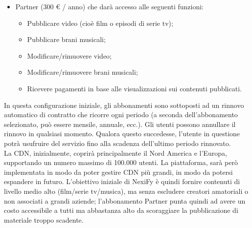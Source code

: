 \begin{itemize}
	\item Partner (300 € / anno) che darà accesso alle seguenti funzioni:
	\begin{itemize}
   		\item Pubblicare video (cioè film o episodi di serie tv);
		\item Pubblicare brani musicali;
		\item Modificare/rimuovere video;
		\item Modificare/rimuovere brani musicali;
		\item Ricevere pagamenti in base alle visualizzazioni sui contenuti pubblicati.
	\end{itemize}
\end{itemize}

In questa configurazione iniziale, gli abbonamenti sono sottoposti ad un rinnovo automatico di contratto che
ricorre ogni periodo (a seconda dell'abbonamento selezionato, può essere mensile, annuale, ecc.). Gli utenti
possono annullare il rinnovo in qualsiasi momento. Qualora questo succedesse, l'utente in questione potrà
usufruire del servizio fino alla scadenza dell'ultimo periodo rinnovato.\\

La CDN, inizialmente, coprirà principalmente il Nord America e l'Europa, supportando un numero massimo di 100.000 utenti. La piattaforma, sarà però implementata in modo da poter gestire CDN più grandi, in modo da potersi espandere in futuro. L'obiettivo iniziale di NexiFy è quindi fornire contenuti di livello medio alto (film/serie tv/musica), ma senza escludere creatori amatoriali o non associati a grandi aziende; l'abbonamento Partner punta quindi ad avere un costo accessibile a tutti ma abbastanza alto da scoraggiare la pubblicazione di materiale troppo scadente.
